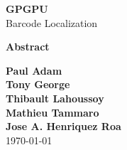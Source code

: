 \documentclass[11pt]{article}
\begin{document}
\begin{titlepage}
    \begin{center}
      \Huge \textbf{GPGPU}\\
      \vspace*{1\baselineskip}
      \huge Barcode Localization
    \vfill
    \end{center}
    \textbf{Abstract}
    \vfill
     \tableofcontents
  \begin{center}
    \vfill
    \normalsize \textbf{Paul Adam}\\
    \normalsize \textbf{Tony George}\\
    \normalsize \textbf{Thibault Lahoussoy}\\
    \normalsize \textbf{Mathieu Tammaro}\\
    \normalsize \textbf{Jose A. Henriquez Roa}\\
    \vspace*{2\baselineskip} \today \rhead{\today}
  \end{center}
\end{titlepage}

\pagestyle{fancy}
\renewcommand{\headrulewidth}{1pt}
\renewcommand{\footrulewidth}{1pt}
\end{document}
